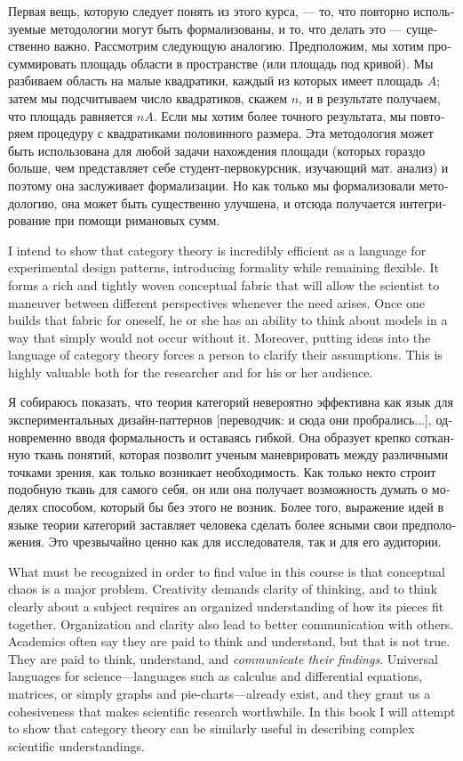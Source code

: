 \documentclass[a4paper]{book}
\theoremstyle{myth}
\begin{document}
\begin{russian}
Первая вещь, которую следует понять из этого курса, — то, что повторно используемые методологии могут быть формализованы, и то, что делать это — существенно важно. Рассмотрим следующую аналогию. Предположим, мы хотим просуммировать площадь области в пространстве (или площадь под кривой). Мы разбиваем область на малые квадратики, каждый из которых имеет площадь $A$; затем мы подсчитываем число квадратиков, скажем $n$, и в результате получаем, что площадь равняется $nA$. Если мы хотим более точного результата, мы повторяем процедуру с квадратиками половинного размера. Эта методология может быть использована для любой задачи нахождения площади (которых гораздо больше, чем представляет себе студент-первокурсник, изучающий мат. анализ) и поэтому она заслуживает формализации. Но как только мы формализовали методологию, она может быть существенно улучшена, и отсюда получается интегрирование при помощи римановых сумм. 

I intend to show that category theory is incredibly efficient as a language for experimental design patterns, introducing formality while remaining flexible. It forms a rich and tightly woven conceptual fabric that will allow the scientist to maneuver between different perspectives whenever the need arises. Once one builds that fabric for oneself, he or she has an ability to think about models in a way that simply would not occur without it.  Moreover, putting ideas into the language of category theory forces a person to clarify their assumptions. This is highly valuable both for the researcher and for his or her audience.

Я собираюсь показать, что теория категорий невероятно эффективна как язык для экспериментальных дизайн-паттернов [переводчик: и сюда они пробрались...], одновременно вводя формальность и оставаясь гибкой. Она образует крепко сотканную ткань понятий, которая позволит ученым маневрировать между различными точками зрения, как только возникает необходимость. Как только некто строит подобную ткань для самого себя, он или она получает возможность думать о моделях способом, который бы без этого не возник. Более того, выражение идей в языке теории категорий заставляет человека сделать более ясными свои предположения. Это чрезвычайно ценно как для исследователя, так и для его аудитории. 

What must be recognized in order to find value in this course is that conceptual chaos is a major problem. Creativity demands clarity of thinking, and to think clearly about a subject requires an organized understanding of how its pieces fit together. Organization and clarity also lead to better communication with others. Academics often say they are paid to think and understand, but that is not true. They are paid to think, understand, and {\em communicate their findings}. Universal languages for science---languages such as calculus and differential equations, matrices, or simply graphs and pie-charts---already exist, and they grant us a cohesiveness that makes scientific research worthwhile. In this book I will attempt to show that category theory can be similarly useful in describing complex scientific understandings.


\end{russian}
\end{document}
